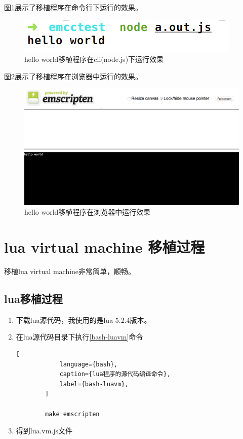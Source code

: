 图\ref{hello-world-sample-cli}展示了移植程序在命令行下运行的效果。

\begin{figure}[h!] %
    \centering
    \includegraphics[width=200bp]{figure/pic/hello-world-sample-cli.png}
    \caption{hello world移植程序在cli(node.js)下运行效果}
    \label{hello-world-sample-cli}
\end{figure}

图\ref{hello-world-sample-html}展示了移植程序在浏览器中运行的效果。

\begin{figure}[h!] %
    \centering
    \includegraphics[width=400bp]{figure/pic/hello-world-sample-html.png}
    \caption{hello world移植程序在浏览器中运行效果}
    \label{hello-world-sample-html}
\end{figure}

\section{lua virtual machine 移植过程}

移植lua virtual machine非常简单，顺畅。

\subsection{lua移植过程}

\begin{enumerate}
    \item 下载lua源代码，我使用的是lua 5.2.4版本。
    \item 在lua源代码目录下执行\ref{bash-luavm}命令
        \begin{lstlisting}[
    		language={bash},
    		caption={lua程序的源代码编译命令},
    		label={bash-luavm},
		]

		make emscripten
		\end{lstlisting}
	\item 得到lua.vm.js文件
\end{enumerate}

